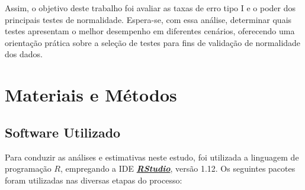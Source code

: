 \documentclass[a4paper,11pt]{article} %
\begin{document}
Assim, o objetivo deste trabalho foi avaliar as taxas de erro tipo I e o poder dos principais testes de normalidade. Espera-se, com essa análise, determinar quais testes apresentam o melhor desempenho em diferentes cenários, oferecendo uma orientação prática sobre a seleção de testes para fins de validação de normalidade dos dados.

\section{Materiais e Métodos} %
\subsection{Software Utilizado} %

Para conduzir as análises e estimativas neste estudo, foi utilizada a linguagem de programação $R$, empregando a IDE \href{https://posit.co/download/rstudio-desktop/}{\textit{\textbf{RStudio}}}, versão 1.12. Os seguintes pacotes foram utilizadas nas diversas etapas do processo:
\end{document}
